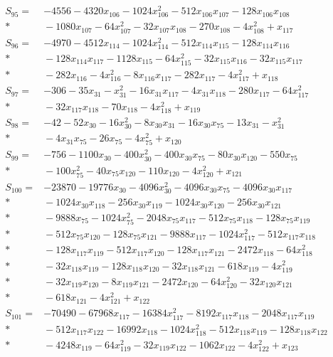 \begin{align*}
S_{95}={}&-4556-4320x_{106}-1024x_{106}^{2}-512x_{106}x_{107}-128x_{106}x_{108}\\*
&{}-1080x_{107}-64x_{107}^{2}-32x_{107}x_{108}-270x_{108}-4x_{108}^{2}+x_{117}\\[3pt]
S_{96}={}&-4970-4512x_{114}-1024x_{114}^{2}-512x_{114}x_{115}-128x_{114}x_{116}\\*
&{}-128x_{114}x_{117}-1128x_{115}-64x_{115}^{2}-32x_{115}x_{116}-32x_{115}x_{117}\\*
&{}-282x_{116}-4x_{116}^{2}-8x_{116}x_{117}-282x_{117}-4x_{117}^{2}+x_{118}\\[3pt]
S_{97}={}&-306-35x_{31}-x_{31}^{2}-16x_{31}x_{117}-4x_{31}x_{118}-280x_{117}-64x_{117}^{2}\\*
&{}-32x_{117}x_{118}-70x_{118}-4x_{118}^{2}+x_{119}\\[3pt]
S_{98}={}&-42-52x_{30}-16x_{30}^{2}-8x_{30}x_{31}-16x_{30}x_{75}-13x_{31}-x_{31}^{2}\\*
&{}-4x_{31}x_{75}-26x_{75}-4x_{75}^{2}+x_{120}\\[3pt]
S_{99}={}&-756-1100x_{30}-400x_{30}^{2}-400x_{30}x_{75}-80x_{30}x_{120}-550x_{75}\\*
&{}-100x_{75}^{2}-40x_{75}x_{120}-110x_{120}-4x_{120}^{2}+x_{121}\\[3pt]
S_{100}={}&-23870-19776x_{30}-4096x_{30}^{2}-4096x_{30}x_{75}-4096x_{30}x_{117}\\*
&{}-1024x_{30}x_{118}-256x_{30}x_{119}-1024x_{30}x_{120}-256x_{30}x_{121}\\*
&{}-9888x_{75}-1024x_{75}^{2}-2048x_{75}x_{117}-512x_{75}x_{118}-128x_{75}x_{119}\\*
&{}-512x_{75}x_{120}-128x_{75}x_{121}-9888x_{117}-1024x_{117}^{2}-512x_{117}x_{118}\\*
&{}-128x_{117}x_{119}-512x_{117}x_{120}-128x_{117}x_{121}-2472x_{118}-64x_{118}^{2}\\*
&{}-32x_{118}x_{119}-128x_{118}x_{120}-32x_{118}x_{121}-618x_{119}-4x_{119}^{2}\\*
&{}-32x_{119}x_{120}-8x_{119}x_{121}-2472x_{120}-64x_{120}^{2}-32x_{120}x_{121}\\*
&{}-618x_{121}-4x_{121}^{2}+x_{122}\\[3pt]
S_{101}={}&-70490-67968x_{117}-16384x_{117}^{2}-8192x_{117}x_{118}-2048x_{117}x_{119}\\*
&{}-512x_{117}x_{122}-16992x_{118}-1024x_{118}^{2}-512x_{118}x_{119}-128x_{118}x_{122}\\*
&{}-4248x_{119}-64x_{119}^{2}-32x_{119}x_{122}-1062x_{122}-4x_{122}^{2}+x_{123}\\[3pt]

\end{align*}
